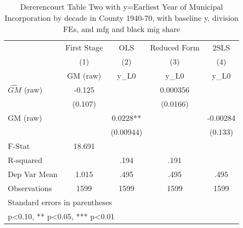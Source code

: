 \begin{table}[htbp]\centering
\def\sym#1{\ifmmode^{#1}\else\(^{#1}\)\fi}
\caption{Dererencourt Table Two with y=Earliest Year of Municipal Incorporation by decade in County 1940-70, with baseline y, division FEs, and mfg and black mig share}
\begin{tabular}{l*{4}{c}}
\toprule
                    & First Stage   &         OLS   &Reduced Form   &        2SLS   \\
                    &\multicolumn{1}{c}{(1)}&\multicolumn{1}{c}{(2)}&\multicolumn{1}{c}{(3)}&\multicolumn{1}{c}{(4)}\\
                    &\multicolumn{1}{c}{GM  (raw)}&\multicolumn{1}{c}{y\_L0}&\multicolumn{1}{c}{y\_L0}&\multicolumn{1}{c}{y\_L0}\\
\midrule
$\hat{GM}$ (raw)    &      -0.125   &               &    0.000356   &               \\
                    &     (0.107)   &               &    (0.0166)   &               \\
\addlinespace
GM  (raw)           &               &      0.0228** &               &    -0.00284   \\
                    &               &   (0.00944)   &               &     (0.133)   \\
\midrule
F-Stat              &      18.691   &               &               &               \\
R-squared           &               &        .194   &        .191   &               \\
Dep Var Mean        &       1.015   &        .495   &        .495   &        .495   \\
Observations        &        1599   &        1599   &        1599   &        1599   \\
\bottomrule
\multicolumn{5}{l}{\footnotesize Standard errors in parentheses}\\
\multicolumn{5}{l}{\footnotesize * p<0.10, ** p<0.05, *** p<0.01}\\
\end{tabular}
\end{table}
